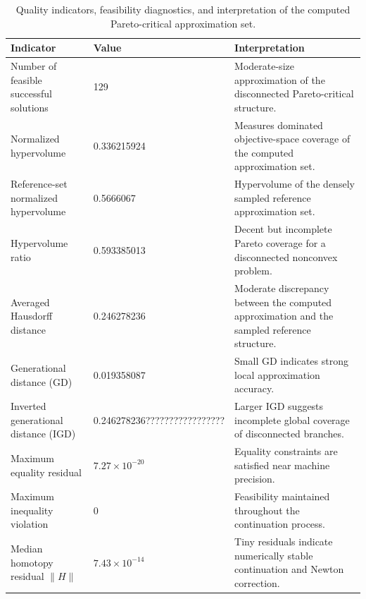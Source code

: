\documentclass[11pt,pdflatex,sn-mathphys-ay]{sn-jnl}%
\theoremstyle{definition}
\theoremstyle{thmstyleone}%
\theoremstyle{thmstyletwo}%
\theoremstyle{thmstylethree}%
\begin{document}
	\begin{table}[h]
		\centering
		\caption{Quality indicators, feasibility diagnostics, and interpretation of the computed Pareto-critical approximation set.}
		\label{tab:quality_indicators_manyobj}
		\renewcommand{\arraystretch}{1.15}
		\begin{tabular}{p{5.2cm} p{2.2cm} p{5.5cm}}
			\toprule
			\textbf{Indicator} & \textbf{Value} & \textbf{Interpretation} \\
			\midrule
			Number of feasible successful solutions 
			& 129 
			& Moderate-size approximation of the disconnected Pareto-critical structure. \\\hline
			Normalized hypervolume 
			& 0.336215924
			& Measures dominated objective-space coverage of the computed approximation set. \\\hline
			Reference-set normalized hypervolume 
			& 0.5666067
			& Hypervolume of the densely sampled reference approximation set. \\\hline
			Hypervolume ratio 
			& 0.593385013
			& Decent but incomplete Pareto coverage for a disconnected nonconvex problem. \\\hline
			Averaged Hausdorff distance 
			& 0.246278236 
			& Moderate discrepancy between the computed approximation and the sampled reference structure. \\\hline
			Generational distance (GD) 
			& 0.019358087 
			& Small GD indicates strong local approximation accuracy. \\\hline
			Inverted generational distance (IGD) 
			& 0.246278236?????????????????
			& Larger IGD suggests incomplete global coverage of disconnected branches. \\\hline
			Maximum equality residual 
			& $7.27\times 10^{-20}$ 
			& Equality constraints are satisfied near machine precision. \\\hline
			Maximum inequality violation 
			& $0$ 
			& Feasibility maintained throughout the continuation process. \\\hline
			Median homotopy residual $\|H\|$ 
			& $7.43\times 10^{-14}$ 
			& Tiny residuals indicate numerically stable continuation and Newton correction. \\
			\bottomrule
		\end{tabular}
	\end{table}
	
\end{document}
